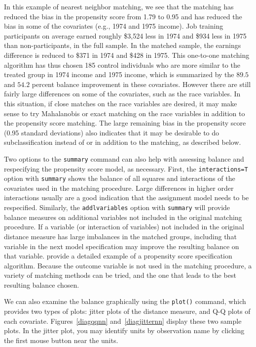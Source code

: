 \documentclass[oneside,letterpaper,titlepage]{article}
\begin{document}
\begin{enumerate}
In this example of nearest neighbor matching, we see that the matching has reduced the bias in the propensity score from 
1.79 to 0.95 and has reduced the bias in some of the covariates (e.g., 1974 and 1975 income).  Job training participants on 
average earned roughly \$3,524 less in 1974 and \$934 less in 1975 than non-participants, in the full sample.  
In the matched sample, the earnings difference is reduced to \$371 in 1974 and \$428 in 1975.  This
one-to-one matching algorithm has thus chosen 185 control individuals
who are more similar to the treated group in 1974 income and 1975
income, which is summarized by the $89.5$ and $54.2$ percent
balance improvement in these covariates.  However 
there are still fairly large differences on some of the covariates, such as the race variables.  In this situation, if close
matches on the race variables are desired, it may make sense to try Mahalanobis or exact matching on the race variables in
addition to the propensity score matching.  The large remaining bias in the propensity score (0.95 standard deviations) also
indicates that it may be desirable to do subclassification instead of or in addition to the matching, as described below.  

Two options to the \texttt{summary} command can also help with assessing balance and respecifying the propensity score
model, as necessary.  First, the {\tt interactions=T} option with {\tt summary}
shows the balance of all squares and interactions of the covariates
used in the matching procedure.  Large differences in higher order interactions usually are a good indication
that the assignment model needs to be respecified.   Similarly, the {\tt addlvariables} option with {\tt summary}
will provide balance measures on additional variables not included in the original matching procedure.  If a variable
(or interaction of variables) not included in the original distance measure has large imbalances in the matched groups, 
including that variable in the next model specification may improve the resulting balance on that variable.  \cite{DehWah99} 
provide a detailed example of a propensity score specification algorithm.   Because the outcome variable is not used
in the matching procedure, a variety of matching methods can be tried, and the one that leads to the best resulting balance
chosen.


We can also examine the balance graphically using the \texttt{plot()} command, 
which provides two types of plots: jitter plots of
the distance measure, and Q-Q plots of each covariate.  Figures~\ref{diagqqnn} and~\ref{diagjitternn} display these two sample
plots.  In the jitter plot, you may identify units by observation name
by clicking the first mouse button near the units.  


\end{enumerate}
\end{document}
